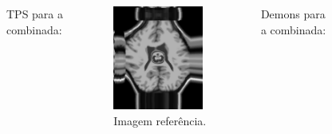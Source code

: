 \documentclass[t]{beamer}
\begin{document}
\begin{frame}
   \begin{columns}[c]
        TPS para a combinada:
        \begin{figure}[!h]
          \begin{center}
            \includegraphics[width=0.9\textwidth]{../images/resultDistSin.png}
            \caption{Imagem referência.}
          \end{center}
        \end{figure}
       Demons para a combinada:
        \begin{figure}[!h]
          \begin{center}

\end{center}
\end{figure}
\end{columns}
\end{frame}
\end{document}
